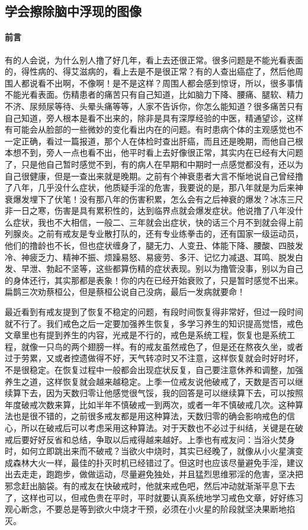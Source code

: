 \subsection{学会擦除脑中浮现的图像}

\paragraph*{前言}

有的人会说，为什么别人撸了好几年，看上去还很正常。很多问题是不能光看表面的，得性病的、得艾滋病的，看上去是不是很正常？有的人查出癌症了，然后他周围人都说看不出啊，不像啊！是不是这样？周围人都会感到惊讶，所以，很多事情不能光看表面。伤精患者的痛苦只有自己知道，比如脑力下降、腰痛、腿软、精力不济、尿频尿等待、头晕头痛等等，人家不告诉你，你怎么能知道？很多痛苦只有自己知道，旁人根本是看不出来的，除非是具有深厚经验的中医，精通望诊，这样有可能会从脸部的一些微妙的变化看出内在的问题。有时患病个体的主观感觉也不一定正确，看过一篇报道，那个人在体检时查出肝癌，而且还是晚期，而他自己根本想不到，旁人一点也看不出，他平时看上去好像很正常，其实内在已经有大问题了，只是他自己暂时感觉不到，有的病人在早期和中期时一点感觉都没有，还以为自己很健康，但是一查出来就是晚期。之前有个神衰患者大言不惭地说自己曾经撸了八年，几乎没什么症状，他质疑手淫的危害，我要说的是，那八年就是为后来神衰爆发埋下了伏笔！没有那八年的伤害积累，怎么会有之后神衰的爆发？冰冻三尺非一日之寒，伤害是具有累积性的，达到临界点就会爆发症状。他说撸了八年没什么症状，我也不大相信，一般二、三年就会出症状，快的话三个月不到就会得上前列腺炎。之前有戒友是专业散打队的，还有专业练拳击的，还有国家一级运动员，他们的撸龄也不长，但也症状缠身了，腿无力、人变丑、体能下降、腰酸、四肢发冷、神疲乏力、精神不振、烦躁易怒、易疲劳、多汗、记忆力减退、耳鸣、脱发白发、早泄、勃起不坚等，这些都算伤精的症状表现。别以为撸管没事，别以为自己的身体还行，其实那都是表象！你的内在已经开始衰败了，只是暂时感觉不出来。扁鹊三次劝蔡桓公，但是蔡桓公说自己没病，最后一发病就要命！

最近看到有戒友提到了恢复不稳定的问题，有段时间恢复得非常好，但过一段时间就不行了。我们戒色之后一定要加强养生恢复，多学习养生的知识提高觉悟，戒色文章里也有提到养生的内容，光戒是不行的，戒色是系统工程，恢复也是系统工程，就像一只鸟的两个翅膀一样。有的戒友虽然戒色了，但是还在熬夜久坐，或者过于劳累，又或者控遗做得不好，天气转凉时又不注意，这样恢复就会时好时坏，不是很稳定。在恢复过程中一般都会出现症状反复，自己要注意休养和调整，加强养生之道，这样恢复就会越来越稳定。上季一位戒友说他破戒了，天数是否可以继续算下去，因为天数归零让他感觉很气馁，我的回答是可以继续算下去，可以按照年度破戒次数来算，比如半年不慎破戒一到两次，或者一年不慎破戒几次。这种算法也是很不错的，之前很多戒友都是用这种算法，天数归零的确会影响戒色的信心，所以在破戒后可以考虑采用这种算法。对于天数也不必过于纠结，关键是在破戒后要好好反省和总结，争取以后戒得越来越好。上季也有戒友问：当浴火焚身时，如何立即跳出来而不破戒？当欲火中烧时，其实已经晚了，就像从小火星演变成森林大火一样，最佳的扑灭时机已经错过了。但这时也应该尽量避免手淫，建议出去走走，跑跑步，做做运动，尽量避免独处，并且猛烈思维邪淫的危害，坚决把邪念赶出脑袋。有的戒友在快破戒时，他就来戒色吧，然后冲动就渐渐平息下去了，这样也可以，但戒色贵在平时，平时就要认真系统地学习戒色文章，好好练习观心断念，不要总是等到欲火中烧才干预，必须在小火星的阶段就坚决果断地掐灭。

